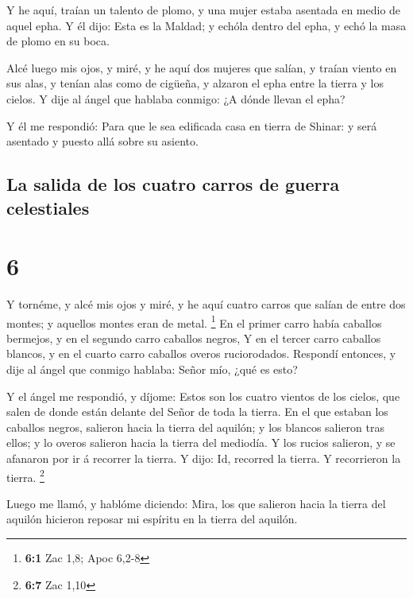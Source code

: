  Y he aquí, traían un talento de plomo, y una mujer estaba
asentada en medio de aquel epha.  Y él dijo: Esta es la
Maldad; y echóla dentro del epha, y echó la masa de plomo en su boca.

 Alcé luego mis ojos, y miré, y he aquí dos mujeres que
salían, y traían viento en sus alas, y tenían alas como de cigüeña, y
alzaron el epha entre la tierra y los cielos.  Y dije al
ángel que hablaba conmigo: ¿A dónde llevan el epha?

 Y él me respondió: Para que le sea edificada casa en
tierra de Shinar: y será asentado y puesto allá sobre su asiento.

\hypertarget{la-salida-de-los-cuatro-carros-de-guerra-celestiales}{%
\subsection{La salida de los cuatro carros de guerra
celestiales}\label{la-salida-de-los-cuatro-carros-de-guerra-celestiales}}

\hypertarget{section-5}{%
\section{6}\label{section-5}}

 Y tornéme, y alcé mis ojos y miré, y he aquí cuatro carros
que salían de entre dos montes; y aquellos montes eran de metal.
\footnote{\textbf{6:1} Zac 1,8; Apoc 6,2-8}  En el primer
carro había caballos bermejos, y en el segundo carro caballos negros,
 Y en el tercer carro caballos blancos, y en el cuarto carro
caballos overos ruciorodados.  Respondí entonces, y dije al
ángel que conmigo hablaba: Señor mío, ¿qué es esto?

 Y el ángel me respondió, y díjome: Estos son los cuatro
vientos de los cielos, que salen de donde están delante del Señor de
toda la tierra.  En el que estaban los caballos negros,
salieron hacia la tierra del aquilón; y los blancos salieron tras ellos;
y lo overos salieron hacia la tierra del mediodía.  Y los
rucios salieron, y se afanaron por ir á recorrer la tierra. Y dijo: Id,
recorred la tierra. Y recorrieron la tierra. \footnote{\textbf{6:7} Zac
  1,10}

 Luego me llamó, y hablóme diciendo: Mira, los que salieron
hacia la tierra del aquilón hicieron reposar mi espíritu en la tierra
del aquilón.

